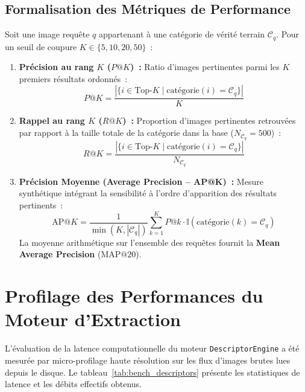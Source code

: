 \subsection{Formalisation des Métriques de Performance}
Soit une image requête $q$ appartenant à une catégorie de vérité terrain $\mathcal{C}_q$. Pour un seuil de coupure $K \in \{5, 10, 20, 50\}$~:
\begin{enumerate}
    \item \textbf{Précision au rang $K$ ($P@K$)~:} Ratio d'images pertinentes parmi les $K$ premiers résultats ordonnés~:
    \begin{equation}
    P@K = \frac{|\{i \in \text{Top-}K \mid \text{catégorie}(i) = \mathcal{C}_q\}|}{K}
    \end{equation}
    \item \textbf{Rappel au rang $K$ ($R@K$)~:} Proportion d'images pertinentes retrouvées par rapport à la taille totale de la catégorie dans la base ($N_{\mathcal{C}_q} = 500$)~:
    \begin{equation}
    R@K = \frac{|\{i \in \text{Top-}K \mid \text{catégorie}(i) = \mathcal{C}_q\}|}{N_{\mathcal{C}_q}}
    \end{equation}
    \item \textbf{Précision Moyenne (Average Precision -- AP@K)~:} Mesure synthétique intégrant la sensibilité à l'ordre d'apparition des résultats pertinents~:
    \begin{equation}
    \text{AP}@K = \frac{1}{\min(K, |\mathcal{C}_q|)} \sum_{k=1}^K P@k \cdot \mathbb{I}(\text{catégorie}(k) = \mathcal{C}_q)
    \end{equation}
    La moyenne arithmétique sur l'ensemble des requêtes fournit la \textbf{Mean Average Precision} ($\text{MAP}@20$).
\end{enumerate}

\section{Profilage des Performances du Moteur d'Extraction}

L'évaluation de la latence computationnelle du moteur \texttt{DescriptorEngine} a été mesurée par micro-profilage haute résolution sur les flux d'images brutes lues depuis le disque. Le tableau~\ref{tab:bench_descriptors} présente les statistiques de latence et les débits effectifs obtenus.

